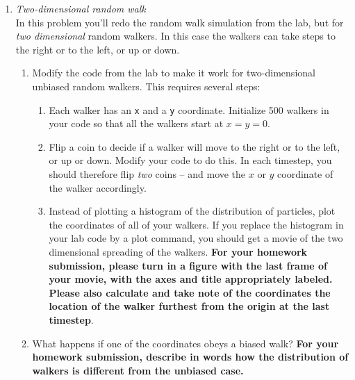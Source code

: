\documentclass[12pt]{article}
\begin{document}
\begin{enumerate}
\item  \textit{Two-dimensional random walk}\\
In this problem you'll redo the random walk simulation from the lab, but for {\sl two dimensional} random walkers.  In this case the walkers can take steps to the right or to the left, or up or down.
\begin{enumerate}
\item Modify the code from the lab to make it work for two-dimensional unbiased random walkers. This requires several steps:
\begin{enumerate}
\item Each walker has an \verb+x+ and a \verb+y+ coordinate.  Initialize 500 walkers in your code so that all the walkers start at $x = y = 0$.
\item Flip a coin to decide if a walker will move to the right or to the left, or up or down.  Modify your code to do this.  In each timestep, you should therefore flip \textit{two} coins -- and move the $x$ or $y$ coordinate of the walker accordingly.
\item Instead of plotting a histogram of the distribution of particles, plot the coordinates of all of your walkers.
  If you replace the histogram in your lab code by a plot command, you should get a movie of the two dimensional spreading of the walkers.  \textbf{For your homework submission, please turn in a figure with the last frame of your movie, with the axes and title appropriately labeled.  Please also calculate and take note of the coordinates the location of the walker furthest from the origin at the last timestep}. %
\end{enumerate}
\item What happens if one of the coordinates obeys a biased walk?  \textbf{For your homework submission, describe in words how the distribution of walkers is different from the unbiased case.}
\end{enumerate}


\end{enumerate}
\end{document}
